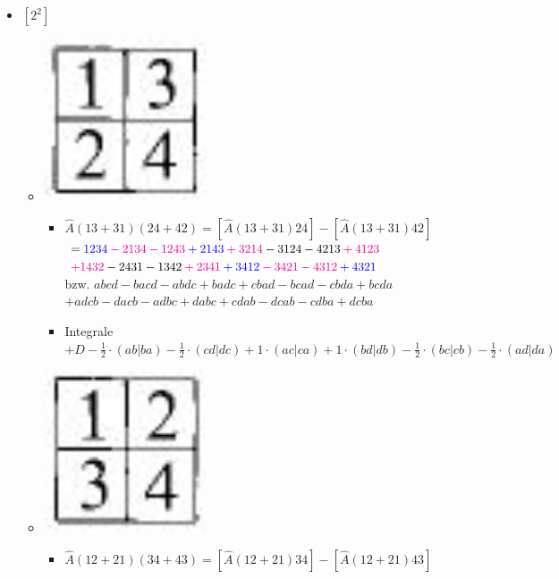 \documentclass[12pt,a4paper]{article}
\newcommand{\h}[2]{\color{#1} #2 \color{black} }
\newcommand{\equalInM}[1]{\h{blue}{#1}} %
\newcommand{\equalInTableau}[1]{\h{magenta}{#1}} %
\begin{document}
\begin{itemize}
\begin{itemize}
\end{itemize}
\item $\left[ 2 ^2 \right]$ 
\begin{itemize}
\item \includegraphics[scale=0.2]{build/young-2hoch2-13.png}
\begin{itemize}
\item $\hat{A} (13+31) (24+42) = \left[ \hat{A} (13+31)24  \right] - \left[ \hat{A} (13+31)42 \right]$ \\ 
$ = \equalInM{1234} \equalInTableau{- 2134} \equalInTableau{- 1243} \equalInM{+ 2143}
\equalInTableau{+ 3214} - 3124 - 4213 \equalInTableau{+ 4123} $\\
$ \equalInTableau{+ 1432} - 2431 - 1342 \equalInTableau{+ 2341}
\equalInM{+ 3412} \equalInTableau{- 3421 } \equalInTableau{- 4312 }\equalInM{+ 4321}$ \\
bzw. $ abcd - bacd - abdc + badc + cbad - bcad - cbda + bcda$\\
$+adcb - dacb - adbc + dabc + cdab - dcab - cdba + dcba$
\item Integrale \\
 $ + D -  \frac{1}{2} \cdot (ab|ba) - \frac{1}{2} \cdot (cd|dc) + 1 \cdot (ac|ca) + 1 \cdot (bd|db) - \frac{1}{2} \cdot (bc|cb) - \frac{1}{2} \cdot (ad|da)$ 
\end{itemize}
\item \includegraphics[scale=0.2]{build/young-2hoch2-12.png}
\begin{itemize}
\item $\hat{A} (12+21) (34+43) = \left[ \hat{A} (12+21) 34 \right] - \left[ \hat{A} (12+21)43\right]$ \\ 

\end{itemize}
\end{itemize}
\end{itemize}
\end{document}

